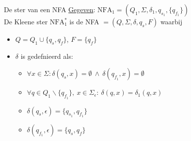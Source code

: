 \begin{pro}{De ster van een NFA}
    \underline{Gegeven}: $\text{NFA}_1 = (Q_1,\Sigma, \delta_1, q_{s_1}, \{q_{f_1}\})$ \\

    De Kleene ster $\text{NFA}_1^*$ is de NFA $= (Q,\Sigma, \delta, q_s, F)$ waarbij \\

    \vspace{-0.1cm}
    \begin{minipage}{.56\textwidth}
        \begin{itemize}
            \item $Q = Q_1 \cup \{q_s, q_f\}$, $F = \{q_f\}$
            \item 
                $\delta$ is gedefnieerd als:
                \begin{itemize}
                    \item $\forall x \in \Sigma: \delta(q_{s}, x) = \emptyset \ \land \ \delta(q_{f_1}, x) = \emptyset$
                    \item $\forall q \in Q_{1}\backslash \{q_{f_1}\}, \ x \in \Sigma_{\epsilon}: \ \delta(q,x) = \delta_1(q,x)$
                    \item $\delta(q_s, \epsilon) = \{q_{s_1}, q_{f_1}\}$
                    \item $\delta(q_{f_1}, \epsilon) = \{q_{s}, q_{f}\}$
                \end{itemize}
        \end{itemize}

\end{minipage}
\end{pro}
